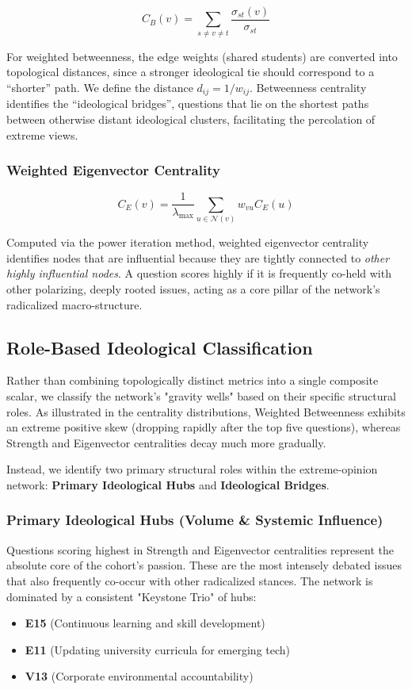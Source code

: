 \documentclass[11pt, a4paper]{article}
\begin{document}
$$C_B(v) = \sum_{s \neq v \neq t} \frac{\sigma_{st}(v)}{\sigma_{st}}$$

For weighted betweenness, the edge weights (shared students) are converted into topological distances, since a stronger ideological tie should correspond to a ``shorter'' path. We define the distance $d_{ij} = 1 / w_{ij}$. Betweenness centrality identifies the ``ideological bridges'', questions that lie on the shortest paths between otherwise distant ideological clusters, facilitating the percolation of extreme views.

\subsubsection{Weighted Eigenvector Centrality}

$$C_E(v) = \frac{1}{\lambda_{\max}} \sum_{u \in \mathcal{N}(v)} w_{vu} C_E(u)$$

Computed via the power iteration method, weighted eigenvector centrality identifies nodes that are influential because they are tightly connected to \textit{other highly influential nodes}. A question scores highly if it is frequently co-held with other polarizing, deeply rooted issues, acting as a core pillar of the network's radicalized macro-structure.

\subsection{Role-Based Ideological Classification}

Rather than combining topologically distinct metrics into a single composite scalar, we classify the network's "gravity wells" based on their specific structural roles. As illustrated in the centrality distributions, Weighted Betweenness exhibits an extreme positive skew (dropping rapidly after the top five questions), whereas Strength and Eigenvector centralities decay much more gradually. 

Instead, we identify two primary structural roles within the extreme-opinion network: \textbf{Primary Ideological Hubs} and \textbf{Ideological Bridges}.

\subsubsection{Primary Ideological Hubs (Volume \& Systemic Influence)}
Questions scoring highest in Strength and Eigenvector centralities represent the absolute core of the cohort's passion. These are the most intensely debated issues that also frequently co-occur with other radicalized stances. The network is dominated by a consistent "Keystone Trio" of hubs:
\begin{itemize}
    \item \textbf{E15} (Continuous learning and skill development)
    \item \textbf{E11} (Updating university curricula for emerging tech)
    \item \textbf{V13} (Corporate environmental accountability)
\end{itemize}
\end{document}
